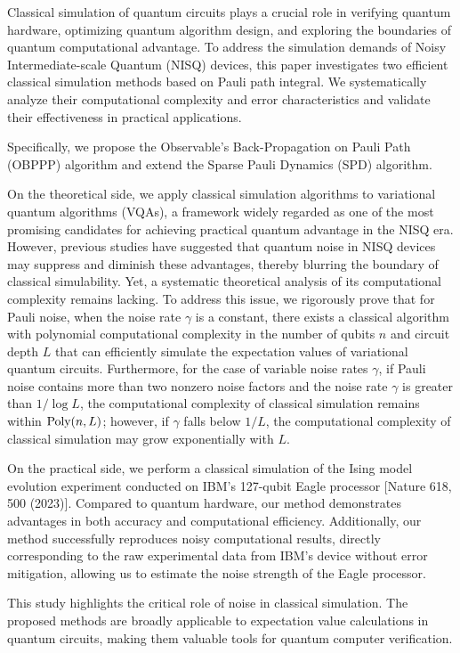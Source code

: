\begin{abstract*}
  Classical simulation of quantum circuits plays a crucial role in verifying quantum hardware, optimizing quantum algorithm design, and exploring the boundaries of quantum computational advantage. 
  To address the simulation demands of Noisy Intermediate-scale Quantum (NISQ) devices, this paper investigates two efficient classical simulation methods based on Pauli path integral. We systematically analyze their computational complexity and error characteristics and validate their effectiveness in practical applications.

  Specifically, we propose the Observable's Back-Propagation on Pauli Path (OBPPP) algorithm and extend the Sparse Pauli Dynamics (SPD) algorithm. 

  On the theoretical side, we apply classical simulation algorithms to variational quantum algorithms (VQAs), a framework widely regarded as one of the most promising candidates for achieving practical quantum advantage in the NISQ era. 
  However, previous studies have suggested that quantum noise in NISQ devices may suppress and diminish these advantages, thereby blurring the boundary of classical simulability. 
  Yet, a systematic theoretical analysis of its computational complexity remains lacking. To address this issue, we rigorously prove that for Pauli noise, when the noise rate \(\gamma\) is a constant, there exists a classical algorithm with polynomial computational complexity in the number of qubits \(n\) and circuit depth \(L\) that can efficiently simulate the expectation values of variational quantum circuits. 
  Furthermore, for the case of variable noise rates \(\gamma\), if Pauli noise contains more than two nonzero noise factors and the noise rate \(\gamma\) is greater than \(1/\log L\), the computational complexity of classical simulation remains within \(\text{Poly}(n, L)\); however, if \(\gamma\) falls below \(1/L\), the computational complexity of classical simulation may grow exponentially with \(L\).

  On the practical side, we perform a classical simulation of the Ising model evolution experiment conducted on IBM’s 127-qubit Eagle processor [Nature 618, 500 (2023)]. Compared to quantum hardware, our method demonstrates advantages in both accuracy and computational efficiency. Additionally, our method successfully reproduces noisy computational results, directly corresponding to the raw experimental data from IBM’s device without error mitigation, allowing us to estimate the noise strength of the Eagle processor. 

  This study highlights the critical role of noise in classical simulation. The proposed methods are broadly applicable to expectation value calculations in quantum circuits, making them valuable tools for quantum computer verification.

\end{abstract*}
